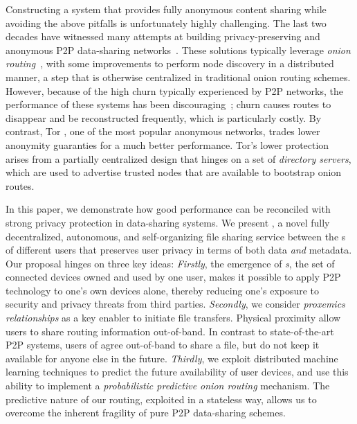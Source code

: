 Constructing a system that provides fully anonymous content sharing while avoiding the above pitfalls is unfortunately highly
challenging. The last two decades have witnessed many attempts at building privacy-preserving and anonymous P2P data-sharing
networks~\cite{Clarke:2001,Gnunet2002,Freedman:2002,Nambiar:2006,Rennhard:2002}.
These solutions typically leverage \emph{onion
 routing}~\cite{Chaum:1981}, with some improvements to perform node
 discovery in a distributed manner, a step that is otherwise
centralized in traditional onion routing schemes. However, because of the high
churn typically experienced by P2P networks, the performance of these systems has been
discouraging~\cite{LeBlond:2013}; churn causes routes to disappear and be
reconstructed frequently, which is particularly costly. By contrast, Tor
\cite{Tor}, one of the most popular anonymous networks,
trades lower anonymity guaranties for a much better performance. Tor's lower protection arises from
a partially centralized design that hinges on a set of \emph{directory
servers}, which are used to advertise trusted nodes that are available to bootstrap onion
routes. 

In this paper, we demonstrate how good performance can be reconciled
with strong privacy protection in data-sharing systems. We present
\name{}, a novel fully decentralized, autonomous,
and self-organizing file sharing service between the \squad{}s of different users that preserves user privacy
in terms of both data \emph{and} metadata.  Our proposal hinges on three
key ideas: \emph{Firstly}, the emergence of \emph{\squad{}s}, the set of connected devices owned and used by one user, 
makes it possible to apply P2P technology to one's own devices
alone, thereby reducing one's exposure to security and privacy threats
from third parties. \emph{Secondly}, we consider \emph{proxemics relationships} as a key enabler to initiate file
transfers. Physical proximity allow users to share
routing information out-of-band.
In contrast to state-of-the-art P2P systems, users of \name agree out-of-band to share a file, but
do not keep it available for anyone else in the future. \emph{Thirdly}, we
exploit distributed machine learning techniques to predict the future
availability of user devices, and use this ability to implement a
\emph{probabilistic predictive onion routing} mechanism. The
predictive nature of our routing, exploited in a stateless way, allows us to overcome the inherent fragility of pure P2P data-sharing schemes. 


